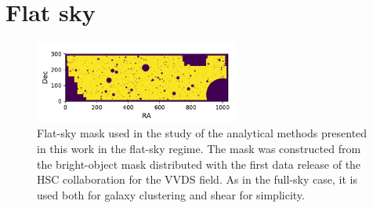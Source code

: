 \documentclass[a4paper,11pt]{article}
\begin{document}
  \appendix
  \section{Flat sky}\label{app:flat}
    \begin{figure}
      \centering
      \includegraphics[width=0.6\textwidth]{./figures/mask-lss_flat1.pdf}
      \caption{Flat-sky mask used in the study of the analytical methods presented in this work in the flat-sky regime. The mask was constructed from the bright-object mask distributed with the first data release of the HSC collaboration \cite{2018PASJ...70S...4A} for the VVDS field. As in the full-sky case, it is used both for galaxy clustering and shear for simplicity.} \label{fig:mask_flat}
    \end{figure}
\end{document}
